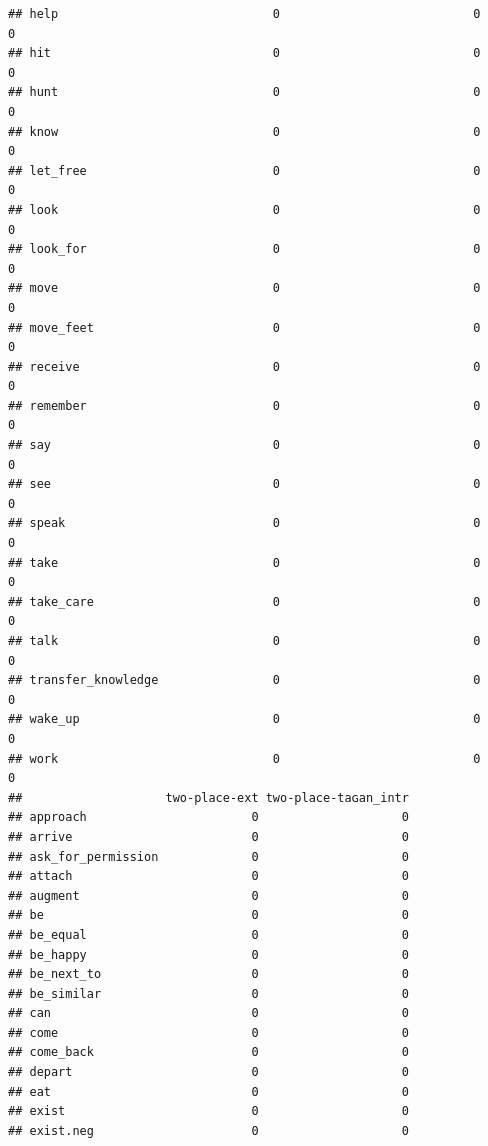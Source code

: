 \documentclass[
]{article}
\begin{document}
\begin{verbatim}
## help                              0                           0           0
## hit                               0                           0           0
## hunt                              0                           0           0
## know                              0                           0           0
## let_free                          0                           0           0
## look                              0                           0           0
## look_for                          0                           0           0
## move                              0                           0           0
## move_feet                         0                           0           0
## receive                           0                           0           0
## remember                          0                           0           0
## say                               0                           0           0
## see                               0                           0           0
## speak                             0                           0           0
## take                              0                           0           0
## take_care                         0                           0           0
## talk                              0                           0           0
## transfer_knowledge                0                           0           0
## wake_up                           0                           0           0
## work                              0                           0           0
##                    two-place-ext two-place-taɢan_intr
## approach                       0                    0
## arrive                         0                    0
## ask_for_permission             0                    0
## attach                         0                    0
## augment                        0                    0
## be                             0                    0
## be_equal                       0                    0
## be_happy                       0                    0
## be_next_to                     0                    0
## be_similar                     0                    0
## can                            0                    0
## come                           0                    0
## come_back                      0                    0
## depart                         0                    0
## eat                            0                    0
## exist                          0                    0
## exist.neg                      0                    0

\end{verbatim}
\end{document}
